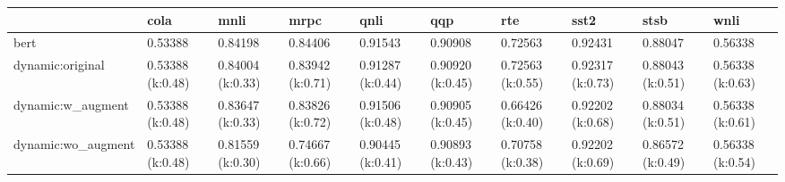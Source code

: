\begin{tabular}{llllllllll}
\toprule
{} &              cola &              mnli &              mrpc &              qnli &               qqp &               rte &              sst2 &              stsb &              wnli \\
\midrule
bert               &           0.53388 &           0.84198 &           0.84406 &           0.91543 &           0.90908 &           0.72563 &           0.92431 &           0.88047 &           0.56338 \\
dynamic:original   &  0.53388 (k:0.48) &  0.84004 (k:0.33) &  0.83942 (k:0.71) &  0.91287 (k:0.44) &  0.90920 (k:0.45) &  0.72563 (k:0.55) &  0.92317 (k:0.73) &  0.88043 (k:0.51) &  0.56338 (k:0.63) \\
dynamic:w\_augment  &  0.53388 (k:0.48) &  0.83647 (k:0.33) &  0.83826 (k:0.72) &  0.91506 (k:0.48) &  0.90905 (k:0.45) &  0.66426 (k:0.40) &  0.92202 (k:0.68) &  0.88034 (k:0.51) &  0.56338 (k:0.61) \\
dynamic:wo\_augment &  0.53388 (k:0.48) &  0.81559 (k:0.30) &  0.74667 (k:0.66) &  0.90445 (k:0.41) &  0.90893 (k:0.43) &  0.70758 (k:0.38) &  0.92202 (k:0.69) &  0.86572 (k:0.49) &  0.56338 (k:0.54) \\
\bottomrule
\end{tabular}
